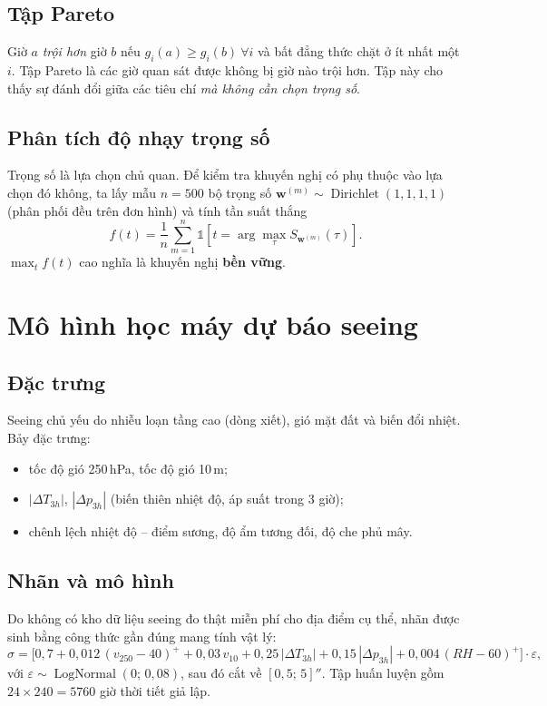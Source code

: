 \documentclass[12pt,a4paper]{article}
\newcommand{\ind}{\mathbb{1}}
\newcommand{\arcsec}{\ensuremath{''}}
\begin{document}
\subsection{Tập Pareto}
Giờ $a$ \emph{trội hơn} giờ $b$ nếu $g_i(a)\ge g_i(b)\ \forall i$ và bất đẳng thức chặt ở ít
nhất một $i$. Tập Pareto là các giờ quan sát được không bị giờ nào trội hơn. Tập này cho thấy
sự đánh đổi giữa các tiêu chí \emph{mà không cần chọn trọng số}.

\subsection{Phân tích độ nhạy trọng số}
Trọng số là lựa chọn chủ quan. Để kiểm tra khuyến nghị có phụ thuộc vào lựa chọn đó không, ta
lấy mẫu $n=500$ bộ trọng số $\bm{w}^{(m)}\sim\operatorname{Dirichlet}(1,1,1,1)$ (phân phối đều
trên đơn hình) và tính tần suất thắng
\begin{equation}
f(t) = \frac{1}{n}\sum_{m=1}^{n}\ind\!\left[t = \arg\max_{\tau} S_{\bm{w}^{(m)}}(\tau)\right].
\end{equation}
$\max_t f(t)$ cao nghĩa là khuyến nghị \textbf{bền vững}.

\section{Mô hình học máy dự báo seeing}

\subsection{Đặc trưng}
Seeing chủ yếu do nhiễu loạn tầng cao (dòng xiết), gió mặt đất và biến đổi nhiệt. Bảy đặc trưng:
\begin{itemize}[nosep]
  \item tốc độ gió 250\,hPa, tốc độ gió 10\,m;
  \item $|\Delta T_{3h}|$, $|\Delta p_{3h}|$ (biến thiên nhiệt độ, áp suất trong 3 giờ);
  \item chênh lệch nhiệt độ -- điểm sương, độ ẩm tương đối, độ che phủ mây.
\end{itemize}

\subsection{Nhãn và mô hình}
Do không có kho dữ liệu seeing đo thật miễn phí cho địa điểm cụ thể, nhãn được sinh bằng công
thức gần đúng mang tính vật lý:
\begin{equation}
\sigma = \Big[0{,}7 + 0{,}012\,(v_{250}-40)^+ + 0{,}03\,v_{10} + 0{,}25\,|\Delta T_{3h}|
 + 0{,}15\,|\Delta p_{3h}| + 0{,}004\,(RH-60)^+\Big]\cdot\varepsilon,
\end{equation}
với $\varepsilon\sim\operatorname{LogNormal}(0;\,0{,}08)$, sau đó cắt về $[0{,}5;\,5]\arcsec$.
Tập huấn luyện gồm $24\times240 = 5760$ giờ thời tiết giả lập.
\end{document}
